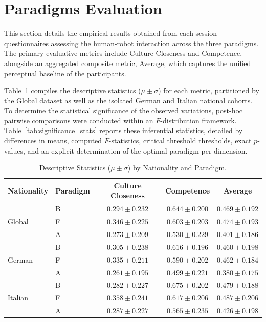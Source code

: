 \section{Paradigms Evaluation}
This section details the empirical results obtained from each session questionnaires assessing the human-robot interaction across the three paradigms.
The primary evaluative metrics include Culture Closeness and Competence, alongside an aggregated composite metric, Average, which captures the unified perceptual baseline of the participants. 

Table~\ref{tab:nat_desc_stats} compiles the descriptive statistics ($\mu \pm \sigma$) for each metric, partitioned by the Global dataset as well as the isolated German and Italian national cohorts. 
To determine the statistical significance of the observed variations, post-hoc pairwise comparisons were conducted within an $F$-distribution framework. 
Table~\ref{tab:significance_stats} reports these inferential statistics, detailed by differences in means, computed $F$-statistics, critical threshold thresholds, exact $p$-values, and an explicit determination of the optimal paradigm per dimension.

\begin{table}[ht]
\centering
\begin{tabular}{llccc}
\toprule
Nationality & Paradigm & Culture Closeness & Competence & Average \\
\midrule
\multirow{3}{*}{Global}
 & B & $0.294 \pm 0.232$ & $0.644 \pm 0.200$ & $0.469 \pm 0.192$ \\
 & F & $0.346 \pm 0.225$ & $0.603 \pm 0.203$ & $0.474 \pm 0.193$ \\
 & A & $0.273 \pm 0.209$ & $0.530 \pm 0.229$ & $0.401 \pm 0.186$ \\
\midrule
\multirow{3}{*}{German}
 & B & $0.305 \pm 0.238$ & $0.616 \pm 0.196$ & $0.460 \pm 0.198$ \\
 & F & $0.335 \pm 0.211$ & $0.590 \pm 0.202$ & $0.462 \pm 0.184$ \\
 & A & $0.261 \pm 0.195$ & $0.499 \pm 0.221$ & $0.380 \pm 0.175$ \\
\midrule
\multirow{3}{*}{Italian}
 & B & $0.282 \pm 0.227$ & $0.675 \pm 0.202$ & $0.479 \pm 0.188$ \\
 & F & $0.358 \pm 0.241$ & $0.617 \pm 0.206$ & $0.487 \pm 0.206$ \\
 & A & $0.287 \pm 0.227$ & $0.565 \pm 0.235$ & $0.426 \pm 0.198$ \\
\bottomrule
\end{tabular}
\caption{Descriptive Statistics ($\mu \pm \sigma$) by Nationality and Paradigm.}
\label{tab:nat_desc_stats}
\end{table}

